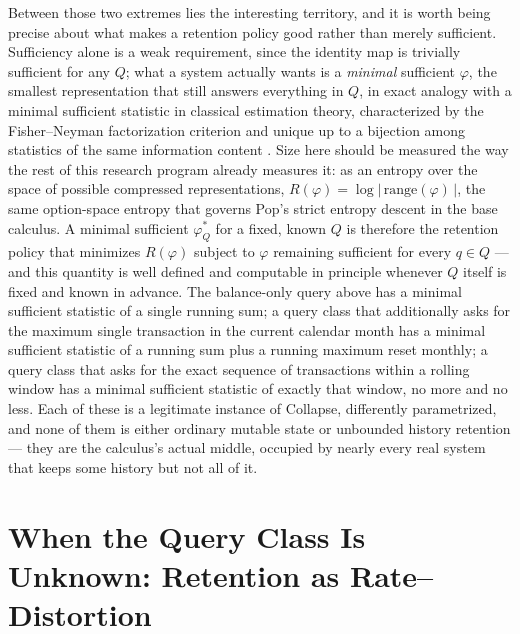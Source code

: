\documentclass[11pt]{article}
\begin{document}
Between those two extremes lies the interesting territory, and it is worth being precise about what makes a retention policy good rather than merely sufficient. Sufficiency alone is a weak requirement, since the identity map is trivially sufficient for any $Q$; what a system actually wants is a \emph{minimal} sufficient $\varphi$, the smallest representation that still answers everything in $Q$, in exact analogy with a minimal sufficient statistic in classical estimation theory, characterized by the Fisher--Neyman factorization criterion and unique up to a bijection among statistics of the same information content \cite{lehmann1998}. Size here should be measured the way the rest of this research program already measures it: as an entropy over the space of possible compressed representations, $R(\varphi) = \log |\, \mathrm{range}(\varphi) \,|$, the same option-space entropy that governs Pop's strict entropy descent in the base calculus. A minimal sufficient $\varphi^{*}_Q$ for a fixed, known $Q$ is therefore the retention policy that minimizes $R(\varphi)$ subject to $\varphi$ remaining sufficient for every $q \in Q$ --- and this quantity is well defined and computable in principle whenever $Q$ itself is fixed and known in advance. The balance-only query above has a minimal sufficient statistic of a single running sum; a query class that additionally asks for the maximum single transaction in the current calendar month has a minimal sufficient statistic of a running sum plus a running maximum reset monthly; a query class that asks for the exact sequence of transactions within a rolling window has a minimal sufficient statistic of exactly that window, no more and no less. Each of these is a legitimate instance of Collapse, differently parametrized, and none of them is either ordinary mutable state or unbounded history retention --- they are the calculus's actual middle, occupied by nearly every real system that keeps some history but not all of it.

\section{When the Query Class Is Unknown: Retention as Rate--Distortion}
\end{document}
